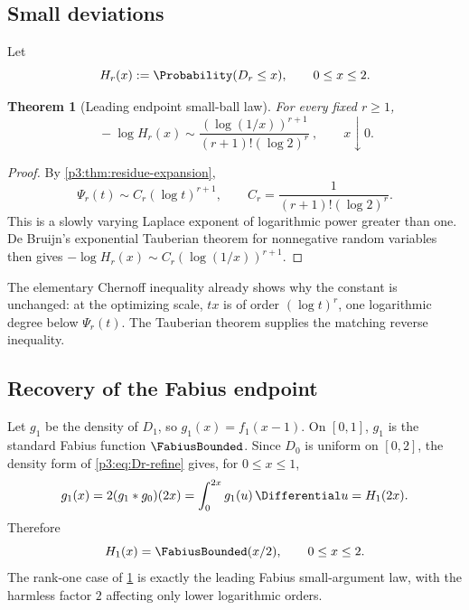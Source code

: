\documentclass[11pt,oneside]{article}
\newtheorem{theorem}{Theorem}[section]
\theoremstyle{definition}
\theoremstyle{remark}
\begin{document}
\subsection{Small deviations}

Let
\begin{equation}\label{p3:eq:Hr}
  H_r(x):=\Probability(D_r\le x),\qquad 0\le x\le2.
\end{equation}

\begin{theorem}[Leading endpoint small-ball law]\label{p3:thm:small-ball}
For every fixed $r\ge1$,
\begin{equation}\label{p3:eq:small-ball}
 \boxed{\ 
 -\log H_r(x)
 \sim\frac{(\log(1/x))^{r+1}}
 {(r+1)!(\log2)^r}
 \ },\qquad x\downarrow0.
\end{equation}
\end{theorem}

\begin{proof}
By \cref{p3:thm:residue-expansion},
\[
 \Psi_r(t)\sim C_r(\log t)^{r+1},
 \qquad
 C_r=\frac1{(r+1)!(\log2)^r}.
\]
This is a slowly varying Laplace exponent of logarithmic power greater than one.  De Bruijn's exponential Tauberian theorem for nonnegative random variables \cite{p3:debruijn1959} then gives
$-\log H_r(x)\sim C_r(\log(1/x))^{r+1}$.
\end{proof}

\begin{remark}
The elementary Chernoff inequality already shows why the constant is unchanged: at the optimizing scale, $tx$ is of order $(\log t)^r$, one logarithmic degree below $\Psi_r(t)$.  The Tauberian theorem supplies the matching reverse inequality.
\end{remark}

\subsection{Recovery of the Fabius endpoint}

Let $g_1$ be the density of $D_1$, so $g_1(x)=f_1(x-1)$.  On $[0,1]$,
$g_1$ is the standard Fabius function $\FabiusBounded$.  Since $D_0$ is
uniform on $[0,2]$, the density form of \eqref{p3:eq:Dr-refine} gives, for
$0\le x\le1$,
\[
 g_1(x)=2(g_1*g_0)(2x)=\int_0^{2x}g_1(u)\,\Differential u=H_1(2x).
\]
Therefore
\begin{equation}\label{p3:eq:H1-F}
  H_1(x)=\FabiusBounded(x/2),\qquad 0\le x\le2.
\end{equation}
The rank-one case of \cref{p3:thm:small-ball} is exactly the leading Fabius small-argument law, with the harmless factor $2$ affecting only lower logarithmic orders.
\end{document}
